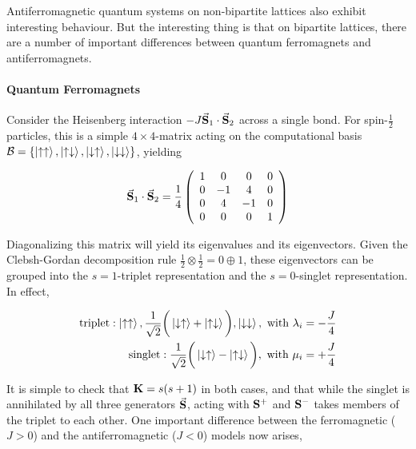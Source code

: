 \documentclass{homework}
\begin{document}
Antiferromagnetic quantum systems on non-bipartite lattices also exhibit interesting behaviour. But the interesting thing is that on bipartite lattices, there are a number of important differences between quantum ferromagnets and antiferromagnets. \\

\paragraph{\textbf{Quantum Ferromagnets}}

Consider the Heisenberg interaction $-J \vec{{\bf S}}_1 \cdot \vec{{\bf S}}_2$ across a single bond. For spin-$\frac{1}{2}$ particles, this is a simple $4 \times 4$-matrix acting on the computational basis $\mathcal{B} = \{\ket{\uparrow\uparrow}, \ket{\uparrow \downarrow}, \ket{\downarrow \uparrow}, \ket{\downarrow\downarrow}\}$, yielding 

\begin{equation*} \vec{\spin}_1 \cdot \vec{\spin}_2 = \frac{1}{4} \left(\begin{array}{*{11}c}1 & 0 & 0 & 0 \\0 & -1 & 4 & 0 \\0 & 4 & -1 & 0\\0 & 0 & 0 & 1\\\end{array}\right)\end{equation*}

Diagonalizing this matrix will yield its eigenvalues and its eigenvectors. Given the Clebsh-Gordan decomposition rule $\frac{1}{2} \otimes \frac{1}{2} = 0 \oplus 1$, these eigenvectors can be grouped into the $s=1$-triplet representation and the $s=0$-singlet representation. In effect,

\begin{equation}
    \begin{split}
        \textnormal{triplet}: \ket{\uparrow \uparrow}, \frac{1}{\sqrt{2}} \bigg(\ket{\downarrow \uparrow} + \ket{\uparrow\downarrow}\bigg), \ket{\downarrow\downarrow}, \textnormal{ with } \lambda_i = -\frac{J}{4} \\
        \textnormal{singlet}: \frac{1}{\sqrt{2}} \bigg(\ket{\downarrow \uparrow} - \ket{\uparrow\downarrow}\bigg), \textnormal{ with } \mu_i = +\frac{J}{4}
    \end{split}
\end{equation}

It is simple to check that ${\bf K} = s(s+1)$ in both cases, and that while the singlet is annihilated by all three generators $\vec{\bf S}$, acting with ${\bf S}^+$ and ${\bf S}^-$ takes members of the triplet to each other. One important difference between the ferromagnetic ($J > 0$) and the antiferromagnetic ($J < 0$) models now arises,
\end{document}
